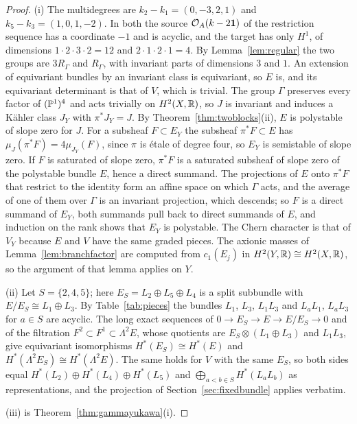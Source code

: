 \begin{proof}
(i) The multidegrees are $k_2-k_1=(0,-3,2,1)$ and $k_5-k_3=(1,0,1,-2)$.
In both the source $\mathcal{O}_A(k-2\mathbf{1})$ of the restriction sequence has a
coordinate $-1$ and is acyclic, and the target has only $H^1$, of
dimensions $1\cdot2\cdot3\cdot2=12$ and $2\cdot1\cdot2\cdot1=4$. By
Lemma~\ref{lem:regular} the two groups are $3R_\Gamma$ and $R_\Gamma$, with
invariant parts of dimensions $3$ and $1$. An extension of equivariant
bundles by an invariant class is equivariant, so $E$ is, and its
equivariant determinant is that of $V$, which is trivial. The group
$\Gamma$ preserves every factor of $(\mathbb{P}^1)^4$ and acts trivially on
$H^2(X,\mathbb{R})$, so $J$ is invariant and induces a K\"ahler class $J_Y$ with
$\pi^*J_Y=J$. By Theorem~\ref{thm:twoblocks}(ii), $E$ is polystable of
slope zero for $J$. For a subsheaf $F\subset E_Y$ the subsheaf
$\pi^*F\subset E$ has $\mu_J(\pi^*F)=4\mu_{J_Y}(F)$, since $\pi$ is \'etale
of degree four, so $E_Y$ is semistable of slope zero. If $F$ is saturated
of slope zero, $\pi^*F$ is a saturated subsheaf of slope zero of the
polystable bundle $E$, hence a direct summand. The projections of $E$ onto
$\pi^*F$ that restrict to the identity form an affine space on which
$\Gamma$ acts, and the average of one of them over $\Gamma$ is an invariant
projection, which descends; so $F$ is a direct summand of $E_Y$, both
summands pull back to direct summands of $E$, and induction on the rank
shows that $E_Y$ is polystable. The Chern character is that of
$V_Y$ because $E$ and $V$ have the same graded pieces. The axionic masses
of Lemma~\ref{lem:branchfactor} are computed from $c_1(E_j)$ in
$H^2(Y,\mathbb{R})\cong H^2(X,\mathbb{R})$, so the argument of that lemma applies on $Y$.

(ii) Let $S=\{2,4,5\}$; here $E_S=L_2\oplus L_5\oplus L_4$ is a split
subbundle with $E/E_S\cong L_1\oplus L_3$. By Table~\ref{tab:pieces} the
bundles $L_1$, $L_3$, $L_1L_3$ and $L_aL_1$, $L_aL_3$ for $a\in S$ are
acyclic. The long exact sequences of $0\to E_S\to E\to E/E_S\to0$ and of
the filtration $F^2\subset F^1\subset\Lambda^2E$, whose quotients are
$E_S\otimes(L_1\oplus L_3)$ and $L_1L_3$, give equivariant isomorphisms
$H^\ast(E_S)\cong H^\ast(E)$ and $H^\ast(\Lambda^2E_S)\cong H^\ast(\Lambda^2E)$.
The same holds for $V$ with the same $E_S$, so both sides equal
$H^\ast(L_2)\oplus H^\ast(L_4)\oplus H^\ast(L_5)$ and
$\bigoplus_{a<b\in S}H^\ast(L_aL_b)$ as representations, and the projection
of Section~\ref{sec:fixedbundle} applies verbatim.

(iii) is Theorem~\ref{thm:gammayukawa}(i).
\end{proof}

